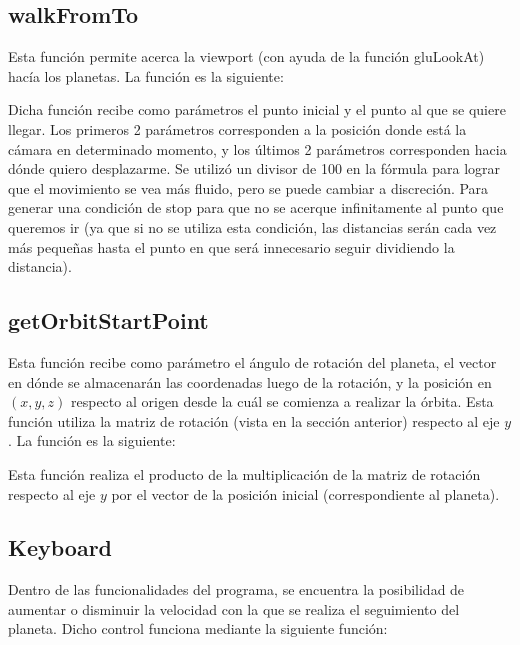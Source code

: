 \documentclass[journal]{IEEEtran}
\begin{document}
\subsection{walkFromTo}

Esta función permite acerca la viewport (con ayuda de la función gluLookAt) hacía los planetas. La función es la siguiente:



Dicha función recibe como parámetros el punto inicial y el punto al que se quiere llegar. Los primeros 2 parámetros corresponden a la posición donde está la cámara en determinado momento, y los últimos 2 parámetros corresponden hacia dónde quiero desplazarme. Se utilizó un divisor de 100 en la fórmula para lograr que el movimiento se vea más fluido, pero se puede cambiar a discreción. Para generar una condición de stop para que no se acerque infinitamente al punto que queremos ir (ya que si no se utiliza esta condición, las distancias serán cada vez más pequeñas hasta el punto en que será innecesario seguir dividiendo la distancia).

\subsection{getOrbitStartPoint}

Esta función recibe como parámetro el ángulo de rotación del planeta, el vector en dónde se almacenarán las coordenadas luego de la rotación, y la posición en $(x,y,z)$ respecto al origen desde la cuál se comienza a realizar la órbita. Esta función utiliza la matriz de rotación (vista en la sección anterior) respecto al eje $y$. La función es la siguiente:



Esta función realiza el producto de la multiplicación de la matriz de rotación respecto al eje $y$ por el vector de la posición inicial (correspondiente al planeta).

\subsection{Keyboard}

Dentro de las funcionalidades del programa, se encuentra la posibilidad de aumentar o disminuir la velocidad con la que se realiza el seguimiento del planeta. Dicho control funciona mediante la siguiente función:


\end{document}
